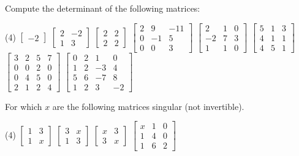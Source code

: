 \begin{exercise}
\pagebreak[2]
Compute the determinant of the following matrices:
\begin{tasks}(4)
\task
$\begin{bmatrix}
-2
\end{bmatrix}$
\task
$\begin{bmatrix}
2 & -2 \\
1 & 3
\end{bmatrix}$
\task
$\begin{bmatrix}
2 & 2 \\
2 & 2
\end{bmatrix}$
\task
$\begin{bmatrix}
2 & 9 & -11 \\
0 & -1 & 5 \\
0 & 0 & 3
\end{bmatrix}$
\task
$\begin{bmatrix}
2 & 1 & 0 \\
-2 & 7 & 3 \\
1 & 1 & 0
\end{bmatrix}$
\task
$\begin{bmatrix}
5 & 1 & 3 \\
4 & 1 & 1 \\
4 & 5 & 1
\end{bmatrix}$
\task
$\begin{bmatrix}
3 & 2 & 5 & 7 \\
0 & 0 & 2 & 0 \\
0 & 4 & 5 & 0 \\
2 & 1 & 2 & 4
\end{bmatrix}$
\task
$\begin{bmatrix}
 0 &  2 &  1 &  0 \\
 1 &  2 & -3 &  4 \\
 5 &  6 & -7 &  8 \\
 1 &  2 &  3 & -2
\end{bmatrix}$
\end{tasks}
\end{exercise}

\begin{exercise}
For which $x$ are the following matrices singular (not invertible).
\begin{tasks}(4)
\task
$\begin{bmatrix}
1 & 3 \\
1 & x
\end{bmatrix}$
\task
$\begin{bmatrix}
3 & x \\
1 & 3
\end{bmatrix}$
\task
$\begin{bmatrix}
x & 3 \\
3 & x
\end{bmatrix}$
\task
$\begin{bmatrix}
x & 1 & 0 \\
1 & 4 & 0 \\
1 & 6 & 2
\end{bmatrix}$
\end{tasks}
\end{exercise}

